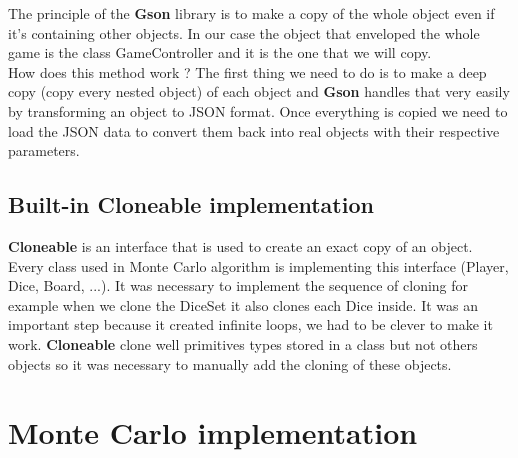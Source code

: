         The principle of the \textbf{Gson} library is to make a copy of the whole object even if it's containing other objects. In our case the object that enveloped the whole game is the class GameController and it is the one that we will copy. \\
        How does this method work ? The first thing we need to do is to make a deep copy (copy every nested object) of each object and \textbf{Gson} handles that very easily by transforming an object to JSON format. Once everything is copied we need to load the JSON data to convert them back into real objects with their respective parameters.
        
        \subsection{Built-in Cloneable implementation}
        
        \textbf{Cloneable} is an interface that is used to create an exact copy of an object. Every class used in Monte Carlo algorithm is implementing this interface (Player, Dice, Board, ...). It was necessary to implement the sequence of cloning for example when we clone the DiceSet it also clones each Dice inside. It was an important step because it created infinite loops, we had to be clever to make it work. \textbf{Cloneable} clone well primitives types stored in a class but not others objects so it was necessary to manually add the cloning of these objects.
        
        
        \section{Monte Carlo implementation}
        
